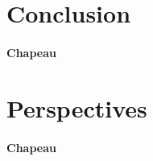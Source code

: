 \section*{Conclusion}
\label{sec:conclusion_et_perspectives_conclusion}

\paragraph{Chapeau}


\section*{Perspectives}
\label{sec:conclusion_et_perspectives_perspectives}

\paragraph{Chapeau}